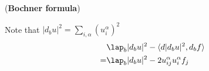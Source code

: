 \documentclass[a4paper,12pt]{article}
\begin{document}
\np (\textbf{Bochner formula}) 

Note that $|d_b u|^2= \sum_{i,\alpha }^{} (u_{i}^{\alpha })^2$ 
$$ \begin{aligned}
    &\lap_b |d_b u|^2-\la d |d_b u|^2, d_b f \ra\\
   =& \lap_b |d_b u|^2-2u_{ij}^{\alpha }u_{i}^{\alpha }f_j\\
\end{aligned}  $$


\section*{ }
\newpage
~~


\end{document}
